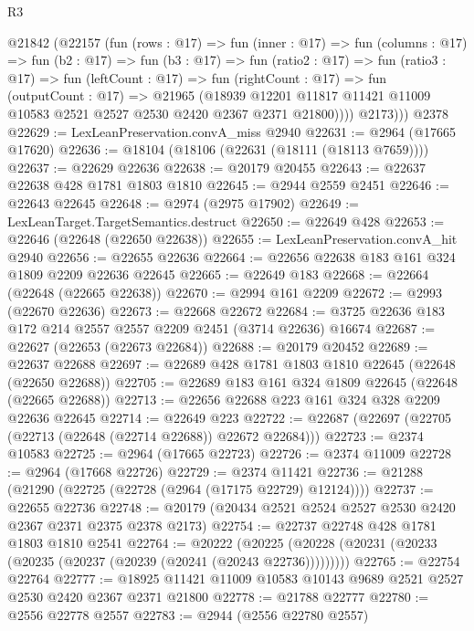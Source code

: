 \begin{lexlean}{R3}
\begin{coremodule}
        @21842
          (@22157
            (fun (rows : @17) =>
            fun (inner : @17) =>
            fun (columns : @17) =>
            fun (b2 : @17) =>
            fun (b3 : @17) =>
            fun (ratio2 : @17) =>
            fun (ratio3 : @17) =>
            fun (leftCount : @17) =>
            fun (rightCount : @17) =>
            fun (outputCount : @17) =>
            @21965
              (@18939
                @12201
                @11817
                @11421
                @11009
                @10583
                @2521
                @2527
                @2530
                @2420
                @2367
                @2371
                @21800))))
          @2173)))
    @2378
@22629 := LexLeanPreservation.convA_miss @2940
@22631 := @2964 (@17665 @17620)
@22636 := @18104 (@18106 (@22631 (@18111 (@18113 @7659))))
@22637 := @22629 @22636
@22638 := @20179 @20455
@22643 := @22637 @22638 @428 @1781 @1803 @1810
@22645 := @2944 @2559 @2451
@22646 := @22643 @22645
@22648 := @2974 (@2975 @17902)
@22649 := LexLeanTarget.TargetSemantics.destruct
@22650 := @22649 @428
@22653 := @22646 (@22648 (@22650 @22638))
@22655 := LexLeanPreservation.convA_hit @2940
@22656 := @22655 @22636
@22664 := @22656 @22638 @183 @161 @324 @1809 @2209 @22636 @22645
@22665 := @22649 @183
@22668 := @22664 (@22648 (@22665 @22638))
@22670 := @2994 @161 @2209
@22672 := @2993 (@22670 @22636)
@22673 := @22668 @22672
@22684 := @3725 @22636 @183 @172 @214 @2557 @2557 @2209 @2451 (@3714 @22636) @16674
@22687 := @22627 (@22653 (@22673 @22684))
@22688 := @20179 @20452
@22689 := @22637 @22688
@22697 := @22689 @428 @1781 @1803 @1810 @22645 (@22648 (@22650 @22688))
@22705 := @22689 @183 @161 @324 @1809 @22645 (@22648 (@22665 @22688))
@22713 := @22656 @22688 @223 @161 @324 @328 @2209 @22636 @22645
@22714 := @22649 @223
@22722 := @22687 (@22697 (@22705 (@22713 (@22648 (@22714 @22688)) @22672 @22684)))
@22723 := @2374 @10583
@22725 := @2964 (@17665 @22723)
@22726 := @2374 @11009
@22728 := @2964 (@17668 @22726)
@22729 := @2374 @11421
@22736 := @21288 (@21290 (@22725 (@22728 (@2964 (@17175 @22729) @12124))))
@22737 := @22655 @22736
@22748 := @20179 (@20434 @2521 @2524 @2527 @2530 @2420 @2367 @2371 @2375 @2378 @2173)
@22754 := @22737 @22748 @428 @1781 @1803 @1810 @2541
@22764 := @20222
    (@20225 (@20228 (@20231 (@20233 (@20235 (@20237 (@20239 (@20241 (@20243 @22736)))))))))
@22765 := @22754 @22764
@22777 := @18925 @11421 @11009 @10583 @10143 @9689 @2521 @2527 @2530 @2420 @2367 @2371 @21800
@22778 := @21788 @22777
@22780 := @2556 @22778 @2557
@22783 := @2944 (@2556 @22780 @2557)

\end{coremodule}
\end{lexlean}
